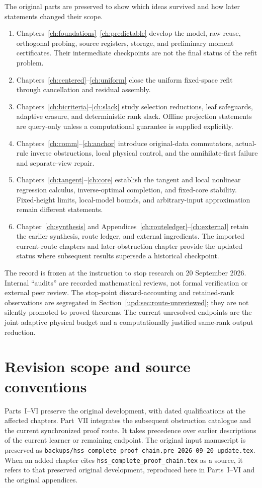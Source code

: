 \documentclass[11pt,oneside,openany,a4paper]{book}
\numberwithin{equation}{chapter}
\theoremstyle{definition}
\theoremstyle{remark}
\newcommand{\sourcefile}[1]{{\small\nolinkurl{#1}}}
\begin{document}
The original parts are preserved to show which ideas survived and how
later statements changed their scope.
\begin{enumerate}
 \item Chapters~\ref{ch:foundations}--\ref{ch:predictable} develop the
 model, raw reuse, orthogonal probing, source registers, storage, and
 preliminary moment certificates.  Their intermediate checkpoints are
 not the final status of the refit problem.
 \item Chapters~\ref{ch:centered}--\ref{ch:uniform} close the uniform
 fixed-space refit through cancellation and residual assembly.
 \item Chapters~\ref{ch:bicriteria}--\ref{ch:slack} study selection
 reductions, leaf safeguards, adaptive erasure, and deterministic rank
 slack.  Offline projection statements are query-only unless a
 computational guarantee is supplied explicitly.
 \item Chapters~\ref{ch:comm}--\ref{ch:anchor} introduce original-data
 commutators, actual-rule inverse obstructions, local physical control,
 and the annihilate-first failure and separate-view repair.
 \item Chapters~\ref{ch:tangent}--\ref{ch:core} establish the tangent
 and local nonlinear regression calculus, inverse-optimal completion,
 and fixed-core stability.  Fixed-height limits, local-model bounds,
 and arbitrary-input approximation remain different statements.
 \item Chapter~\ref{ch:synthesis} and Appendices~\ref{ch:routeledger}--\ref{ch:external} retain the
 earlier synthesis, route ledger, and external ingredients.  The
 imported current-route chapters and later-obstruction chapter provide
 the updated status where subsequent results supersede a historical
 checkpoint.
\end{enumerate}

The record is frozen at the instruction to stop research on
20 September 2026.  Internal ``audits'' are recorded mathematical
reviews, not formal verification or external peer review.  The
stop-point discard-accounting and retained-rank observations are
segregated in Section~\ref{upd:sec:route-unreviewed}; they are not
silently promoted to proved theorems.  The current unresolved endpoints
are the joint adaptive physical budget and a computationally justified
same-rank output reduction.

\clearpage

\section*{Revision scope and source conventions}
Parts~I--VI preserve the original development, with dated qualifications at
the affected chapters. Part~VII integrates the subsequent obstruction
catalogue and the current synchronized proof route. It takes precedence
over earlier descriptions of the current learner or remaining endpoint.
The original input manuscript is preserved as
\sourcefile{backups/hss_complete_proof_chain.pre_2026-09-20_update.tex}.
When an added chapter cites \sourcefile{hss_complete_proof_chain.tex} as a
source, it refers to that preserved original development, reproduced here
in Parts~I--VI and the original appendices.
\end{document}
